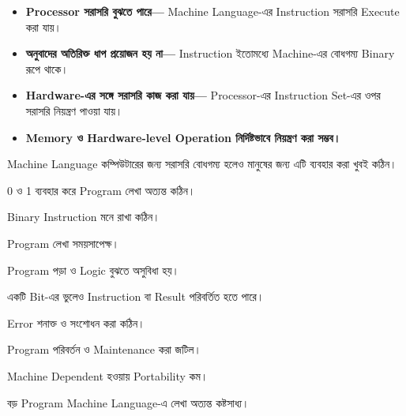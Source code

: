 
\begin{itemize}

\item \textbf{Processor সরাসরি বুঝতে পারে—}
Machine Language-এর Instruction সরাসরি Execute করা যায়।

\item \textbf{অনুবাদের অতিরিক্ত ধাপ প্রয়োজন হয় না—}
Instruction ইতোমধ্যে Machine-এর বোধগম্য Binary রূপে থাকে।

\item \textbf{Hardware-এর সঙ্গে সরাসরি কাজ করা যায়—}
Processor-এর Instruction Set-এর ওপর সরাসরি নিয়ন্ত্রণ পাওয়া যায়।

\item \textbf{Memory ও Hardware-level Operation নির্দিষ্টভাবে নিয়ন্ত্রণ
করা সম্ভব।}

\end{itemize}


Machine Language কম্পিউটারের জন্য সরাসরি বোধগম্য হলেও মানুষের
জন্য এটি ব্যবহার করা খুবই কঠিন।

\begin{compacttwocolpoints}

\item 0 ও 1 ব্যবহার করে Program লেখা অত্যন্ত কঠিন।

\item Binary Instruction মনে রাখা কঠিন।

\item Program লেখা সময়সাপেক্ষ।

\item Program পড়া ও Logic বুঝতে অসুবিধা হয়।

\item একটি Bit-এর ভুলেও Instruction বা Result পরিবর্তিত হতে পারে।

\item Error শনাক্ত ও সংশোধন করা কঠিন।

\item Program পরিবর্তন ও Maintenance করা জটিল।

\item Machine Dependent হওয়ায় Portability কম।

\item বড় Program Machine Language-এ লেখা অত্যন্ত কষ্টসাধ্য।

\end{compacttwocolpoints}

